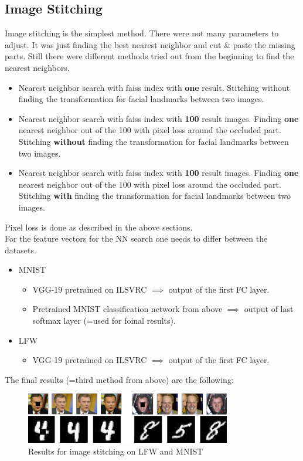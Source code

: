 \documentclass[
     11pt,         %
     a4paper,      %
     oneside,
     ]{article}
\begin{document}
\subsection{Image Stitching}
Image stitching is the simplest method. There were not many parameters to adjust. It was just finding the best nearest neighbor and cut \& paste the missing parts.
Still there were different methods tried out from the beginning to find the nearest neighbors.
\begin{itemize}
  \item Nearest neighbor search with faiss index with \textbf{one} result. Stitching without finding the transformation for facial landmarks between two images.
  \item Nearest neighbor search with faiss index with \textbf{100} result images.
  Finding \textbf{one} nearest neighbor out of the 100 with pixel loss around the occluded part. Stitching \textbf{without} finding the transformation for facial landmarks between two images.
  \item Nearest neighbor search with faiss index with \textbf{100} result images.
  Finding \textbf{one} nearest neighbor out of the 100 with pixel loss around the occluded part. Stitching \textbf{with} finding the transformation for facial landmarks between two images.
\end{itemize}
Pixel loss is done as described in the above sections. \\
For the feature vectors for the NN search one needs to differ between the datasets.
\begin{itemize}
  \item MNIST
  \begin{itemize}
    \item VGG-19 pretrained on ILSVRC $\implies$ output of the first FC layer.
    \item Pretrained MNIST classification network from above $\implies$ output of last softmax layer (=used for foinal results).
  \end{itemize}
  \item LFW
  \begin{itemize}
    \item VGG-19 pretrained on ILSVRC $\implies$ output of the first FC layer.
  \end{itemize}
\end{itemize}
The final results (=third method from above) are the following:
  \begin{figure}[H]
    \begin{center}
      \includegraphics[width=0.8\textwidth]{images/stitching_final2.png}
      \caption{Results for image stitching on LFW and MNIST}
    \end{center}
  \end{figure}
\end{document}
